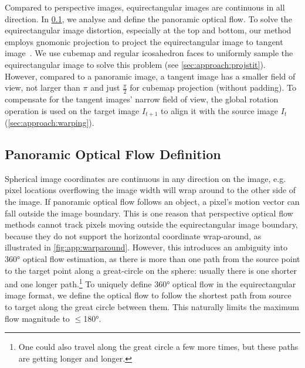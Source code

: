 % 
Compared to perspective images, equirectangular images are continuous in all direction.
In \cref{sec:approach:definition}, we analyse and define the panoramic optical flow.
%
To solve the equirectangular image distortion, especially at the top and bottom, our method employs gnomonic projection to project the equirectangular image to tangent image~\cite{EderSLF2020}.
We use cubemap and regular icosahedron faces to uniformly sample the equirectangular image to solve this problem (see \cref{sec:approach:projstit}).
%
However, compared to a panoramic image, a tangent image has a smaller field of view, not larger than $\pi$ and just $\frac{\pi}{2}$ for cubemap projection (without padding).
To compensate for the tangent images' narrow field of view, the global rotation operation is used on the target image $I_{t+1}$ to align it with the source image $I_t$ (\cref{sec:approach:warping}).


\subsection{Panoramic Optical Flow Definition}
\label{sec:approach:definition}

Spherical image coordinates are continuous in any direction on the image, e.g. pixel locations overflowing the image width will wrap around to the other side of the image.
%
If panoramic optical flow follows an object, a pixel's motion vector can fall outside the image boundary.
This is one reason that perspective optical flow methods cannot track pixels moving outside the equirectangular image boundary, because they do not support the horizontal coordinate wrap-around, as illustrated in \cref{fig:app:warparound}.
%
However, this introduces an ambiguity into 360° optical flow estimation, 
as there is more than one path from the source point to the target point along a great-circle on the sphere:
usually there is one shorter and one longer path.\footnote{One could also travel along the great circle a few more times, but these paths are getting longer and longer.}
%
To uniquely define 360° optical flow in the equirectangular image format, we define the optical flow to follow the shortest path from source to target along the great circle between them.
%
This naturally limits the maximum flow magnitude to $\leq$180°.

